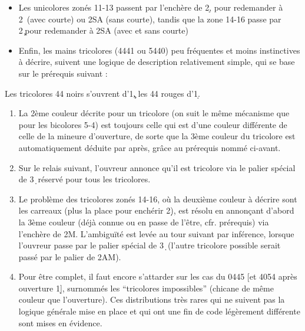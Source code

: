 \documentclass[a4paper]{article}
\begin{document}
\begin{itemize}
\item Les unicolores zonés 11-13 passent par l’enchère de 2\d ,
pour redemander à 2\s\ (avec courte) ou 2SA (sans courte),
tandis que la zone 14-16 passe par 2\c\ pour redemander à 2SA (avec et sans courte)

\end{itemize}

\begin{itemize}
\item Enfin, les mains tricolores (4441 ou 5440) peu fréquentes et moins instinctives à décrire,
suivent une logique de description relativement simple, qui se base sur le prérequis suivant :

\end{itemize}

Les tricolores 44 noirs s'ouvrent d'1\c , les 44 rouges d'1\d .

\begin{enumerate}
\item La 2ème couleur décrite pour un tricolore (on suit le même mécanisme que pour les bicolores 5-4) est toujours celle qui est d’une couleur différente de celle de la mineure d’ouverture, 
de sorte que la 3ème couleur du tricolore est automatiquement déduite par après, grâce au prérequis nommé ci-avant.

\item Sur le relais suivant, l’ouvreur annonce qu’il est tricolore via le palier spécial de 3\d\ réservé pour tous les tricolores.

\item Le problème des tricolores zonés 14-16,
  où la deuxième couleur à décrire sont les carreaux (plus la place pour enchérir 2\d ),
  est résolu en annonçant d’abord la 3ème couleur (déjà connue ou en passe de l’être, cfr. prérequis) via l’enchère de 2M.
  L’ambiguïté est levée au tour suivant par inférence, lorsque l’ouvreur passe par le palier spécial de 3\d\ (l’autre tricolore possible serait passé par le palier de 2AM).

\item Pour être complet, il faut encore s’attarder sur les cas du 0445  [et 4054 après ouverture 1\d ],
  surnommés les ``tricolores impossibles'' (chicane de même couleur que l’ouverture).
  Ces distributions très rares qui ne suivent pas la logique générale mise en place et qui ont une fin de code légèrement différente sont mises en évidence.

\end{enumerate}
\end{document}
